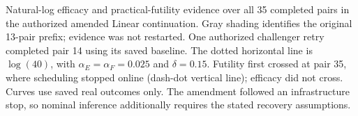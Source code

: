 \caption{Natural-log efficacy and practical-futility evidence over all 35 completed
pairs in the authorized amended Linear continuation. Gray shading identifies the
original 13-pair prefix; evidence was not restarted. One authorized challenger
retry completed pair 14 using its saved baseline. The dotted horizontal line is
$\log(40)$, with $\alpha_E=\alpha_F=0.025$ and $\delta=0.15$. Futility first crossed
at pair 35, where scheduling stopped online (dash-dot vertical line); efficacy
did not cross. Curves use saved real outcomes only. The amendment followed an
infrastructure stop, so nominal inference additionally requires the stated
recovery assumptions.}
\label{fig:prospective-live-stopping}
